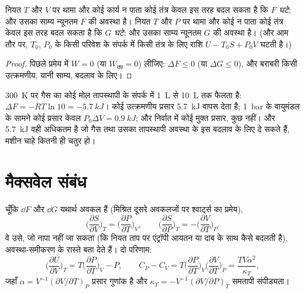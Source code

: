 \begin{theorem}[बदलाव और साम्य की कसौटियाँ]\label{thm:b2:thermodynamic-potentials:criteria}
नियत $T$ और $V$ पर थामा और कोई कार्य न पाता कोई तंत्र केवल इस तरह
बदल सकता है कि \emph{$F$ घटे}; और उसका साम्य न्यूनतम $F$ की अवस्था है।
नियत $T$ और $P$ पर थामा और कोई  न पाता कोई तंत्र
केवल इस तरह बदल सकता है कि \emph{$G$ घटे}; और उसका साम्य
न्यूनतम $G$ की अवस्था है। (और आम तौर पर, $T_0$, $P_0$ के किसी परिवेश के संपर्क में
किसी तंत्र के लिए राशि $U - T_0S + P_0V$ घटती है।)
\end{theorem}

\begin{proof}
पिछले प्रमेय में $W = 0$ (या $W_{\text{उप}} = 0$) लीजिए: $\Delta F
\le 0$ (या $\Delta G \le 0$), और बराबरी किसी उत्क्रमणीय, यानी
साम्य, बदलाव के लिए।
\end{proof}

\begin{example}\label{ex:b2:thermodynamic-potentials:expansion}
\qty{300}{K} पर गैस का कोई मोल तापस्थापी के संपर्क में \qty{1}{L} से \qty{10}{L}
तक फैलता है: $\Delta F = -RT\ln 10 = \qty{-5.7}{kJ}$। कोई
उत्क्रमणीय प्रसार \qty{5.7}{kJ} वापस देता है; \qty{1}{bar} के वायुमंडल के सामने कोई
प्रसार केवल $P_0\Delta V = \qty{0.9}{kJ}$; और निर्वात में कोई
मुक्त प्रसार, कुछ नहीं। और \qty{5.7}{kJ} वही अधिकतम है जो
गैस तथा उसका तापस्थापी अवस्था के इस बदलाव के लिए दे सकते हैं, मशीन चाहे
कितनी ही चतुर हो।
\end{example}

\section{मैक्सवेल संबंध}

\begin{theorem}[मैक्सवेल संबंध]\label{thm:b2:thermodynamic-potentials:maxwell}
चूँकि $\dd F$ और $\dd G$ यथार्थ अवकल हैं (मिश्रित दूसरे अवकलजों पर
श्वार्ट्स का प्रमेय),
\[
\Big(\frac{\partial S}{\partial V}\Big)_T = \Big(\frac{\partial P}{\partial T}\Big)_V,
\qquad
\Big(\frac{\partial S}{\partial P}\Big)_T = -\Big(\frac{\partial V}{\partial T}\Big)_P .
\]
वे उसे, जो नापा नहीं जा सकता (कि नियत ताप पर एंट्रॉपी आयतन या
दाब के साथ कैसे बदलती है), अवस्था-समीकरण के रास्ते बता देते हैं। दो
परिणाम:
\[
\Big(\frac{\partial U}{\partial V}\Big)_T = T\Big(\frac{\partial P}{\partial T}\Big)_V - P,
\qquad
C_P - C_V = T\Big(\frac{\partial P}{\partial T}\Big)_V\Big(\frac{\partial V}{\partial T}\Big)_P
= \frac{TV\alpha^2}{\kappa_T} ,
\]
जहाँ $\alpha = V^{-1}(\partial V/\partial T)_P$ प्रसार गुणांक है और
$\kappa_T = -V^{-1}(\partial V/\partial P)_T$ समतापी संपीड्यता।
\end{theorem}

